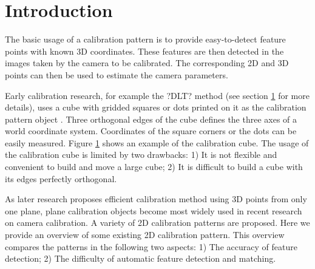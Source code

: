 \documentclass{report}
\begin{document}
\section{Introduction}
The basic usage of a calibration pattern is to provide easy-to-detect feature points with known 3D coordinates. These features are then detected in the images taken by the camera to be calibrated. The corresponding 2D and 3D points can then be used to estimate the camera parameters. 

Early calibration research, for example the ?DLT? method (see section \ref{} for more details), uses a cube with gridded squares or dots printed on it as the calibration pattern object \cite{}. Three orthogonal edges of the cube defines the three axes of a world coordinate system. Coordinates of the square corners or the dots can be easily measured. Figure \ref{} shows an example of the calibration cube. The usage of the calibration cube is limited by two drawbacks: 1) It is not flexible and convenient to build and move a large cube; 2) It is difficult to build a cube with its edges perfectly orthogonal. 

As later research proposes efficient calibration method using 3D points from only one plane, plane calibration objects become most widely used in recent research on camera calibration. A variety of 2D calibration patterns are proposed. Here we provide an overview of some existing 2D calibration pattern. This overview compares the patterns in the following two aspects: 1) The accuracy of feature detection; 2) The difficulty of automatic feature detection and matching. 
\end{document}
